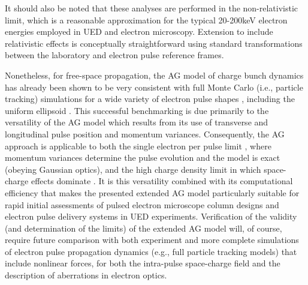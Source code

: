 It should also be noted that these analyses are performed in the non-relativistic limit, which is a reasonable approximation for the typical 20-200keV electron energies employed in UED and electron microscopy.
Extension to include relativistic effects is conceptually straightforward using standard transformations between the laboratory and electron pulse reference frames.

Nonetheless, for free-space propagation, the AG model of charge bunch dynamics has already been shown to be very consistent with full Monte Carlo (i.e., particle tracking) simulations for a wide variety of electron pulse shapes \cite{michalik_analytic_2006,michalik_evolution_2009}, including the uniform ellipsoid \cite{luiten_how_2004}.
This successful benchmarking is due primarily to the versatility of the AG model which results from its use of transverse and longitudinal pulse position and momentum variances.
Consequently, the AG approach is applicable to both the single electron per pulse limit \cite{lobastov_four-dimensional_2005}, where momentum variances determine the pulse evolution and the model is exact (obeying Gaussian optics), and the high charge density limit in which space-charge effects dominate \cite{luiten_how_2004,siwick_ultrafast_2002,cao_femtosecond_2003}.
It is this versatility combined with its computational efficiency that makes the presented extended AG model particularly suitable for rapid initial assessments of pulsed electron microscope column designs and electron pulse delivery systems in UED experiments.
Verification of the validity (and determination of the limits) of the extended AG model will, of course, require future comparison with both experiment and more complete simulations of electron pulse propagation dynamics (e.g., full particle tracking models) that include nonlinear forces, for both the intra-pulse space-charge field and the description of aberrations in electron optics.

